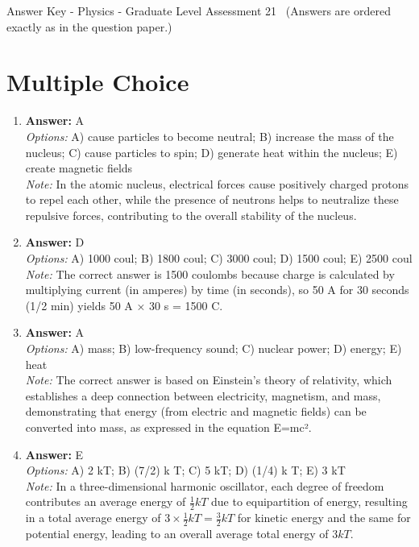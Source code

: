 \documentclass[12pt]{article}
\begin{document}
\begin{center}
Answer Key - Physics - Graduate Level Assessment 21 \
\small (Answers are ordered exactly as in the question paper.)
\end{center}

\section*{Multiple Choice}
\begin{enumerate}[label=\arabic*.]
\item \textbf{Answer:} A
\\ \textit{Options:} A) cause particles to become neutral; B) increase the mass of the nucleus; C) cause particles to spin; D) generate heat within the nucleus; E) create magnetic fields
\\ \textit{Note:} In the atomic nucleus, electrical forces cause positively charged protons to repel each other, while the presence of neutrons helps to neutralize these repulsive forces, contributing to the overall stability of the nucleus.
\item \textbf{Answer:} D
\\ \textit{Options:} A) 1000 coul; B) 1800 coul; C) 3000 coul; D) 1500 coul; E) 2500 coul
\\ \textit{Note:} The correct answer is 1500 coulombs because charge is calculated by multiplying current (in amperes) by time (in seconds), so 50 A for 30 seconds (1/2 min) yields 50 A × 30 s = 1500 C.
\item \textbf{Answer:} A
\\ \textit{Options:} A) mass; B) low-frequency sound; C) nuclear power; D) energy; E) heat
\\ \textit{Note:} The correct answer is based on Einstein's theory of relativity, which establishes a deep connection between electricity, magnetism, and mass, demonstrating that energy (from electric and magnetic fields) can be converted into mass, as expressed in the equation E=mc².
\item \textbf{Answer:} E
\\ \textit{Options:} A) 2 kT; B) (7/2) k T; C) 5 kT; D) (1/4) k T; E) 3 kT
\\ \textit{Note:} In a three-dimensional harmonic oscillator, each degree of freedom contributes an average energy of \( \frac{1}{2} kT \) due to equipartition of energy, resulting in a total average energy of \( 3 \times \frac{1}{2} kT = \frac{3}{2} kT \) for kinetic energy and the same for potential energy, leading to an overall average total energy of \( 3 kT \).

\end{enumerate}
\end{document}
